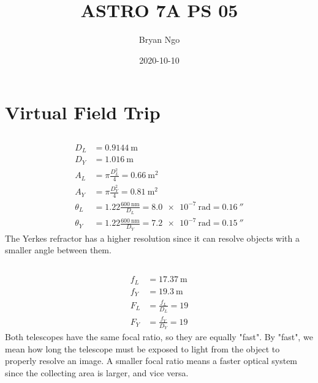 \documentclass{article}
\title{ASTRO 7A PS 05}
\author{Bryan Ngo}
\date{2020-10-10}
\begin{document}
\maketitle

\section{Virtual Field Trip}

\subsection{}

\begin{align}
    D_L &= \SI{0.9144}{\meter} \\
    D_Y &= \SI{1.016}{\meter} \\
    A_L &= \pi \frac{D_L^2}{4} = \SI{0.66}{\meter\squared} \\
    A_Y &= \pi \frac{D_Y^2}{4} = \SI{0.81}{\meter\squared} \\
    \theta_L &= 1.22 \frac{\SI{600}{\nano\meter}}{D_L} = \SI{8.0e-7}{\radian} = \SI{0.16}{\arcsecond} \\
    \theta_Y &= 1.22 \frac{\SI{600}{\nano\meter}}{D_Y} = \SI{7.2e-7}{\radian} = \SI{0.15}{\arcsecond}
\end{align}
The Yerkes refractor has a higher resolution since it can resolve objects with a smaller angle between them.

\subsection{}

\begin{align}
    f_L &= \SI{17.37}{\meter} \\
    f_Y &= \SI{19.3}{\meter} \\
    F_L &= \frac{f_L}{D_L} = \num{19} \\
    F_Y &= \frac{f_Y}{D_Y} = \num{19}
\end{align}
Both telescopes have the same focal ratio, so they are equally "fast".
By "fast", we mean how long the telescope must be exposed to light from the object to properly resolve an image.
A smaller focal ratio means a faster optical system since the collecting area is larger, and vice versa.

\subsection{}
\end{document}
